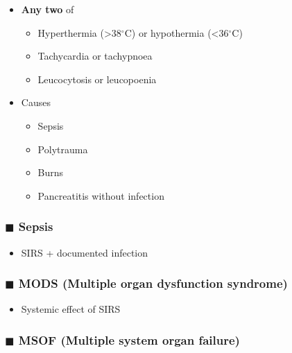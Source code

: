 \documentclass[
  14pt,
]{extarticle}
\providecommand{\tightlist}{%
  \setlength{\itemsep}{0pt}\setlength{\parskip}{0pt}}
\begin{document}
\begin{itemize}
\tightlist
\item
  \textbf{Any two} of

  \begin{itemize}
  \tightlist
  \item
    Hyperthermia (\textgreater38\(^\circ\)C) or hypothermia
    (\textless36\(^\circ\)C)
  \item
    Tachycardia or tachypnoea
  \item
    Leucocytosis or leucopoenia
  \end{itemize}
\item
  Causes

  \begin{itemize}
  \tightlist
  \item
    Sepsis
  \item
    Polytrauma
  \item
    Burns
  \item
    Pancreatitis without infection
  \end{itemize}
\end{itemize}

\hypertarget{blacksquare-sepsis}{%
\subsubsection{\texorpdfstring{\(\blacksquare\)
Sepsis}{\textbackslash blacksquare Sepsis}}\label{blacksquare-sepsis}}

\begin{itemize}
\tightlist
\item
  SIRS + documented infection
\end{itemize}

\hypertarget{blacksquare-mods-multiple-organ-dysfunction-syndrome}{%
\subsubsection{\texorpdfstring{\(\blacksquare\) MODS (Multiple organ
dysfunction
syndrome)}{\textbackslash blacksquare MODS (Multiple organ dysfunction syndrome)}}\label{blacksquare-mods-multiple-organ-dysfunction-syndrome}}

\begin{itemize}
\tightlist
\item
  Systemic effect of SIRS
\end{itemize}

\hypertarget{blacksquare-msof-multiple-system-organ-failure}{%
\subsubsection{\texorpdfstring{\(\blacksquare\) MSOF (Multiple system
organ
failure)}{\textbackslash blacksquare MSOF (Multiple system organ failure)}}\label{blacksquare-msof-multiple-system-organ-failure}}
\end{document}
